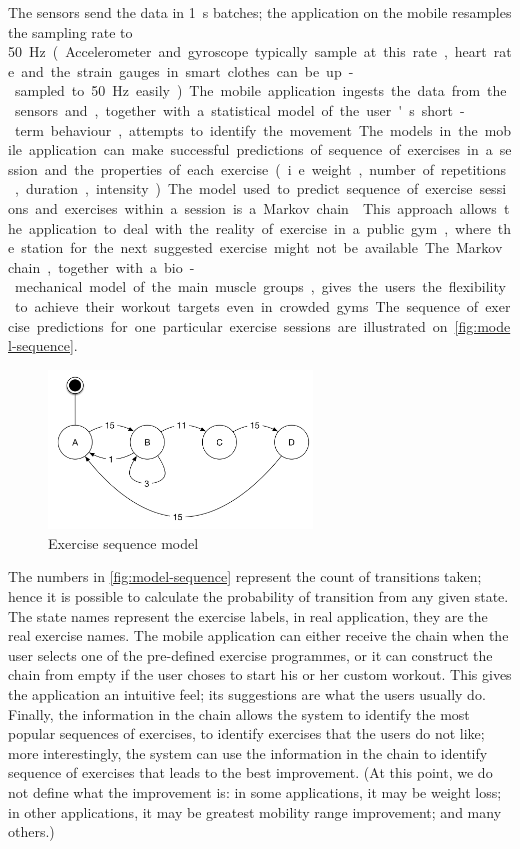 \documentclass[a4paper, 10 pt, conference]{IEEEtran}
\begin{document}
The sensors send the data in \SI{1}{\second} batches; the application on the mobile resamples the sampling rate to \SI{50}\hertz. (Accelerometer and gyroscope typically sample at this rate, heart rate and the strain gauges in smart clothes can be up-sampled to \SI{50}{\hertz} easily.) The mobile application ingests the data from the sensors and, together with a statistical model of the user's short-term behaviour, attempts to identify the movement. The models in the mobile application can make successful predictions of sequence of exercises in a session and the properties of each exercise (i.e. weight, number of repetitions, duration, intensity). The model used to predict sequence of exercise sessions and exercises within a session is a Markov chain \cite{markov-chain-exercise}. This approach allows the application to deal with the reality of exercise in a public gym, where the station for the next suggested exercise might not be available. The Markov chain, together with a bio-mechanical model of the main muscle groups, gives the users the flexibility to achieve their workout targets even in crowded gyms. The sequence of exercise predictions for one particular exercise sessions are illustrated on \autoref{fig:model-sequence}.

\begin{figure}[h]
	\begin{center}
		\caption{Exercise sequence model}
		\label{fig:model-sequence}
		\includegraphics[width=7cm,keepaspectratio]{ri-model-sequence.png}
	\end{center}
\end{figure}

The numbers in \autoref{fig:model-sequence} represent the count of transitions taken; hence it is possible to calculate the probability of transition from any given state. The state names represent the exercise labels, in real application, they are the real exercise names. The mobile application can either receive the chain when the user selects one of the pre-defined exercise programmes, or it can construct the chain from empty if the user choses to start his or her custom workout. This gives the application an intuitive feel; its suggestions are what the users usually do. Finally, the information in the chain allows the system to identify the most popular sequences of exercises, to identify exercises that the users do not like; more interestingly, the system can use the information in the chain to identify sequence of exercises that leads to the best improvement. (At this point, we do not define what the improvement is: in some applications, it may be weight loss; in other applications, it may be greatest mobility range improvement; and many others.)
\end{document}
